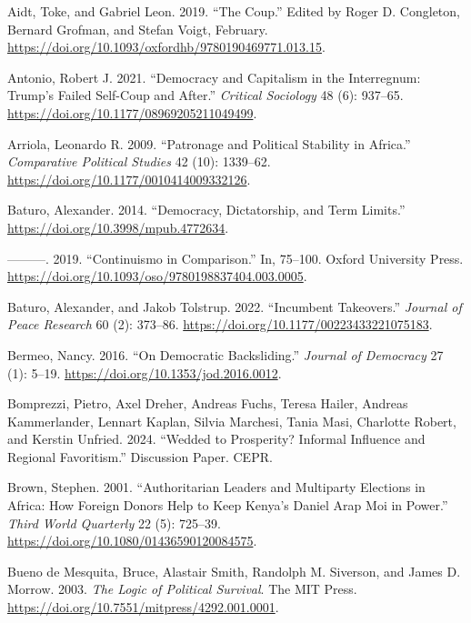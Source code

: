 \documentclass[
  12pt,
]{report}
\newlength{\cslhangindent}
\newenvironment{CSLReferences}[2] %
 {\begin{list}{}{%
  \setlength{\itemindent}{0pt}
  \setlength{\leftmargin}{0pt}
  \setlength{\parsep}{0pt}
  \ifodd #1
   \setlength{\leftmargin}{\cslhangindent}
   \setlength{\itemindent}{-1\cslhangindent}
  \fi
  \setlength{\itemsep}{#2\baselineskip}}}
 {\end{list}}
\begin{document}
\label{refs}
\begin{CSLReferences}{1}{0}
Aidt, Toke, and Gabriel Leon. 2019. {``The Coup.''} Edited by Roger D.
Congleton, Bernard Grofman, and Stefan Voigt, February.
\url{https://doi.org/10.1093/oxfordhb/9780190469771.013.15}.

Antonio, Robert J. 2021. {``Democracy and Capitalism in the Interregnum:
Trump{'}s Failed Self-Coup and After.''} \emph{Critical Sociology} 48
(6): 937--65. \url{https://doi.org/10.1177/08969205211049499}.

Arriola, Leonardo R. 2009. {``Patronage and Political Stability in
Africa.''} \emph{Comparative Political Studies} 42 (10): 1339--62.
\url{https://doi.org/10.1177/0010414009332126}.

Baturo, Alexander. 2014. {``Democracy, Dictatorship, and Term Limits.''}
\url{https://doi.org/10.3998/mpub.4772634}.

---------. 2019. {``Continuismo in Comparison.''} In, 75--100. Oxford
University Press.
\url{https://doi.org/10.1093/oso/9780198837404.003.0005}.

Baturo, Alexander, and Jakob Tolstrup. 2022. {``Incumbent Takeovers.''}
\emph{Journal of Peace Research} 60 (2): 373--86.
\url{https://doi.org/10.1177/00223433221075183}.

Bermeo, Nancy. 2016. {``On Democratic Backsliding.''} \emph{Journal of
Democracy} 27 (1): 5--19. \url{https://doi.org/10.1353/jod.2016.0012}.

Bomprezzi, Pietro, Axel Dreher, Andreas Fuchs, Teresa Hailer, Andreas
Kammerlander, Lennart Kaplan, Silvia Marchesi, Tania Masi, Charlotte
Robert, and Kerstin Unfried. 2024. {``Wedded to Prosperity? Informal
Influence and Regional Favoritism.''} Discussion Paper. CEPR.

Brown, Stephen. 2001. {``Authoritarian Leaders and Multiparty Elections
in Africa: How Foreign Donors Help to Keep Kenya's Daniel Arap Moi in
Power.''} \emph{Third World Quarterly} 22 (5): 725--39.
\url{https://doi.org/10.1080/01436590120084575}.

Bueno de Mesquita, Bruce, Alastair Smith, Randolph M. Siverson, and
James D. Morrow. 2003. \emph{The Logic of Political Survival}. The MIT
Press. \url{https://doi.org/10.7551/mitpress/4292.001.0001}.


\end{CSLReferences}
\end{document}
